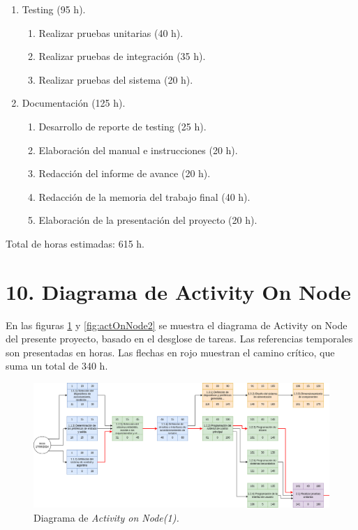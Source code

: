 \documentclass[
11pt, %
]{charter}
\begin{document}
\begin{enumerate}
\begin{enumerate}
	\end{enumerate}		
		
\item Testing (95 h).
	
	\begin{enumerate}
	\item Realizar pruebas unitarias (40 h).
	\item Realizar pruebas de integración (35 h).
	\item Realizar pruebas del sistema (20 h).
	\end{enumerate}		
		
		
\item Documentación (125 h).

	\begin{enumerate}
	\item Desarrollo de reporte de testing (25 h).
	\item Elaboración del manual e instrucciones (20 h).
	\item Redacción del informe de avance (20 h).
	\item Redacción de la memoria del trabajo final (40 h).
	\item Elaboración de la presentación del proyecto (20 h).
	\end{enumerate}

\end{enumerate}

Total de horas estimadas: 615 h.

\section{10. Diagrama de Activity On Node}
\label{sec:AoN}


En las figuras \ref{fig:actOnNode1} y \ref{fig:actOnNode2} se muestra el diagrama de Activity on Node del presente proyecto, basado en el desglose de tareas. Las referencias temporales son presentadas en horas. Las flechas en rojo muestran el camino crítico, que suma un total de 340 h.



\begin{landscape}
\begin{figure}[htpb]
\vspace{55px}
\centering 
\includegraphics[height=.6\textheight]{./Figuras/actOnNode1.png}
\caption{Diagrama de \textit{Activity on Node(1).}}
\label{fig:actOnNode1}
\end{figure}
\end{landscape}
\end{document}
